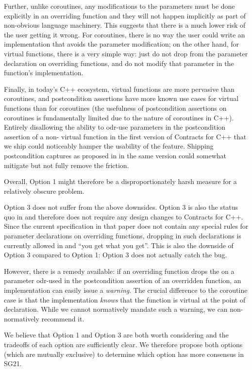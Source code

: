 Further, unlike coroutines, any modifications to the parameters must be done explicitly in an overriding function and they will not happen implicitly as part of non-obvious language machinery. This suggests that there is a much lower risk of the user getting it wrong. For coroutines, there is no way the user could write an implementation that avoids the parameter modification; on the other hand, for virtual functions, there is a very simple way: just do not drop  from the parameter declaration on overriding functions, and do not modify that parameter in the function's implementation. 

Finally, in today's C++ ecosystem, virtual functions are more pervasive than coroutines, and postcondition assertions have more known use cases for virtual functions than for coroutines (the usefulness of postcondition assertions on coroutines is fundamentally limited due to the nature of coroutines in C++). Entirely disallowing the ability to odr-use parameters in the postcondition assertion of a non- virtual function in the first version of Contracts for C++ that we ship could noticeably hamper the usability of the feature. Shipping postcondition captures as proposed in \cite{P3098R0} in the same version could somewhat mitigate but not fully remove the friction.

Overall, Option 1 might therefore be a disproportionately harsh measure for a relatively obscure problem.

Option 3 does not suffer from the above downsides. Option 3 is also the status quo in \cite{P2900R10} and therefore does not require any design changes to Contracts for C++. Since the current specification in that paper does not contain any special rules for parameter declarations on overriding functions, dropping  in such declarations is currently allowed in \cite{P2900R10} and ``you get what you get''. This is also the downside of Option 3 compared to Option 1: Option 3 does not actually catch the bug.

However, there is a remedy available: if an overriding function drops the  on a parameter odr-used in the postcondition assertion of an overridden function, an implementation can easily issue a \emph{warning}. The crucial difference to the coroutine case is that the implementation \emph{knows} that the function is virtual at the point of declaration. While we cannot normatively mandate such a warning, we can non-normatively recommend it.

We believe that Option 1 and Option 3 are both worth considering and the tradeoffs of each option are sufficiently clear. We therefore propose both options (which are mutually exclusive) to determine which option has more consensus in SG21.

